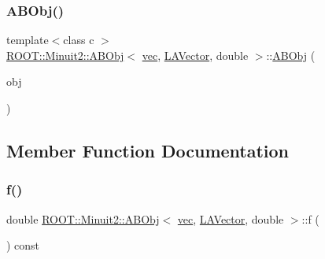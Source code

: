 \mbox{\label{classROOT_1_1Minuit2_1_1ABObj_3_01vec_00_01LAVector_00_01double_01_4_aeb6018846b4e8252a64eb21db982fe96}} 
\subsubsection{\texorpdfstring{ABObj()}{ABObj()}\hspace{0.1cm}{\footnotesize\ttfamily [9/9]}}
{\footnotesize\ttfamily template$<$class c $>$ \\
\mbox{\hyperlink{classROOT_1_1Minuit2_1_1ABObj}{R\+O\+O\+T\+::\+Minuit2\+::\+A\+B\+Obj}}$<$ \mbox{\hyperlink{classROOT_1_1Minuit2_1_1vec}{vec}}, \mbox{\hyperlink{classROOT_1_1Minuit2_1_1LAVector}{L\+A\+Vector}}, double $>$\+::\mbox{\hyperlink{classROOT_1_1Minuit2_1_1ABObj}{A\+B\+Obj}} (\begin{DoxyParamCaption}\item[{const \mbox{\hyperlink{classROOT_1_1Minuit2_1_1ABObj}{A\+B\+Obj}}$<$ \mbox{\hyperlink{classROOT_1_1Minuit2_1_1vec}{vec}}, \mbox{\hyperlink{classROOT_1_1Minuit2_1_1LAVector}{L\+A\+Vector}}, c $>$ \&}]{obj }\end{DoxyParamCaption})\hspace{0.3cm}{\ttfamily [inline]}}



\subsection{Member Function Documentation}
\mbox{\label{classROOT_1_1Minuit2_1_1ABObj_3_01vec_00_01LAVector_00_01double_01_4_a418f4c2409e7afb1804e3033a7aed2fd}} 
\subsubsection{\texorpdfstring{f()}{f()}\hspace{0.1cm}{\footnotesize\ttfamily [1/3]}}
{\footnotesize\ttfamily double \mbox{\hyperlink{classROOT_1_1Minuit2_1_1ABObj}{R\+O\+O\+T\+::\+Minuit2\+::\+A\+B\+Obj}}$<$ \mbox{\hyperlink{classROOT_1_1Minuit2_1_1vec}{vec}}, \mbox{\hyperlink{classROOT_1_1Minuit2_1_1LAVector}{L\+A\+Vector}}, double $>$\+::f (\begin{DoxyParamCaption}{ }\end{DoxyParamCaption}) const\hspace{0.3cm}{\ttfamily [inline]}}

